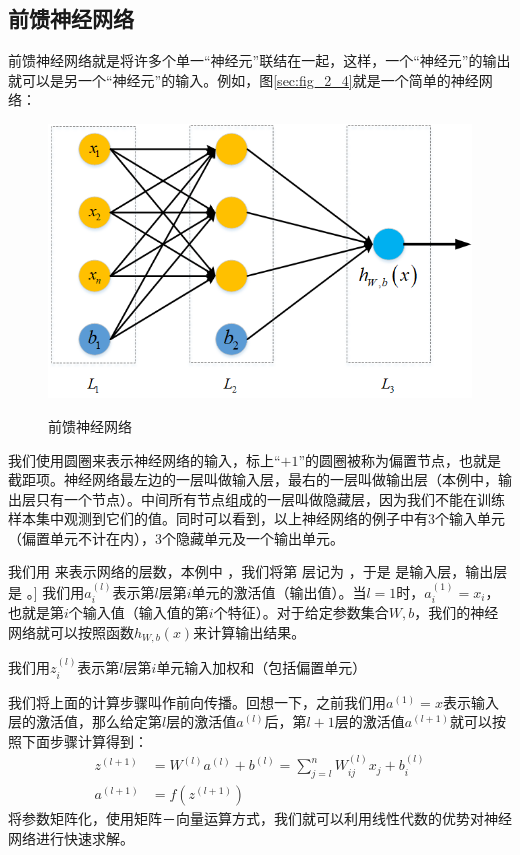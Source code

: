 \subsection{前馈神经网络}
前馈神经网络就是将许多个单一“神经元”联结在一起，这样，一个“神经元”的输出就可以是另一个“神经元”的输入。例如，图\ref{sec:fig_2_4}就是一个简单的神经网络：\par
\begin{figure}
	\centering
	\includegraphics[scale=0.7]{figures/chapter_2/fig_2_4}\label{sec:fig_2_4}
	\caption{前馈神经网络}\label{fig_2_4}
\end{figure}
我们使用圆圈来表示神经网络的输入，标上“$+1$”的圆圈被称为偏置节点，也就是截距项。神经网络最左边的一层叫做输入层，最右的一层叫做输出层（本例中，输出层只有一个节点）。中间所有节点组成的一层叫做隐藏层，因为我们不能在训练样本集中观测到它们的值。同时可以看到，以上神经网络的例子中有3个输入单元（偏置单元不计在内），3个隐藏单元及一个输出单元。\par

 我们用 来表示网络的层数，本例中 ，我们将第 层记为 ，于是 是输入层，输出层是 。] 我们用$a^{(l)}_i$表示第$l$层第$i$单元的激活值（输出值）。当$l=1$时，$a^{(1)}_i = x_i$，也就是第$i$个输入值（输入值的第$i$个特征）。对于给定参数集合$W,b$，我们的神经网络就可以按照函数$h_{W,b}(x)$来计算输出结果。\par
 
我们用$z^{(l)}_i$表示第$l$层第$i$单元输入加权和（包括偏置单元）

我们将上面的计算步骤叫作前向传播。回想一下，之前我们用$a^{(1)} = x$表示输入层的激活值，那么给定第$l$层的激活值$a^{(l)}$后，第$l+1$层的激活值$a^{(l+1)}$就可以按照下面步骤计算得到：
\begin{align}
	z^{(l+1)} &= W^{(l)} a^{(l)} + b^{(l)}=\sum_{j=l}^n W^{(l)}_{ij} x_j + b^{(l)}_i\\
	a^{(l+1)} &= f(z^{(l+1)})
\end{align}
将参数矩阵化，使用矩阵－向量运算方式，我们就可以利用线性代数的优势对神经网络进行快速求解。\par

